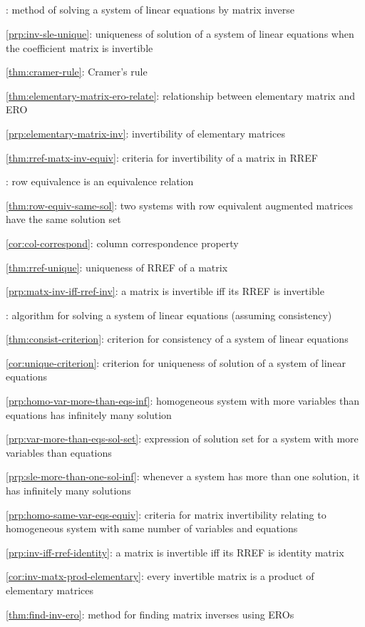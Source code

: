 \subsection*{}
\item {}: method of solving a system of linear
equations by matrix inverse
\item \cref{prp:inv-sle-unique}: uniqueness of solution of a system of linear equations when the coefficient matrix is invertible
\item \cref{thm:cramer-rule}: Cramer's rule
\item \cref{thm:elementary-matrix-ero-relate}: relationship between elementary matrix and ERO
\item \cref{prp:elementary-matrix-inv}: invertibility of elementary matrices
\item \cref{thm:rref-matx-inv-equiv}: criteria for invertibility of a matrix in RREF
\item {}: row equivalence is an equivalence relation
\item \cref{thm:row-equiv-same-sol}: two systems with row equivalent augmented matrices have the same solution set
\item \cref{cor:col-correspond}: column correspondence property
\item \cref{thm:rref-unique}: uniqueness of RREF of a matrix
\item \cref{prp:matx-inv-iff-rref-inv}: a matrix is invertible iff its RREF is invertible
\item {}: algorithm for solving a system of linear equations (assuming consistency)
\item \cref{thm:consist-criterion}: criterion for consistency of a system of linear equations
\item \cref{cor:unique-criterion}: criterion for uniqueness of solution of a system of linear equations
\item \cref{prp:homo-var-more-than-eqs-inf}: homogeneous system with more variables than equations has infinitely many solution
\item \cref{prp:var-more-than-eqs-sol-set}: expression of solution set for a system with more variables than equations
\item \cref{prp:sle-more-than-one-sol-inf}: whenever a system has more than one solution, it has infinitely many solutions
\item \cref{prp:homo-same-var-eqs-equiv}: criteria for matrix invertibility relating to homogeneous system with same number of variables and equations
\item \cref{prp:inv-iff-rref-identity}: a matrix is invertible iff its RREF is identity matrix
\item \cref{cor:inv-matx-prod-elementary}: every invertible matrix is a product of elementary matrices
\item \cref{thm:find-inv-ero}: method for finding matrix inverses using EROs
